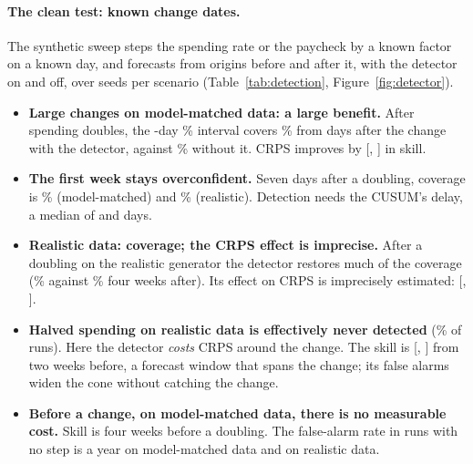 \paragraph{The clean test: known change dates.} The synthetic sweep steps
the spending rate or the paycheck by a known factor on a known day, and
forecasts from origins before and after it, with the detector on and off,
over  seeds per scenario (Table~\ref{tab:detection},
Figure~\ref{fig:detector}).
\begin{itemize}
\item \textbf{Large changes on model-matched data: a large benefit.} After
  spending doubles, the \hB-day \lC\% interval covers
  \% from
   days after the change with the detector, against
  \% without it. CRPS
  improves by 
  [,
  ] in skill.
\item \textbf{The first week stays overconfident.} Seven days after a
  doubling, coverage is \%
  (model-matched) and \%
  (realistic). Detection needs the CUSUM's delay, a median of
   and
   days.
\item \textbf{Realistic data: coverage; the CRPS effect is imprecise.}
  After a doubling on the realistic generator the detector restores much
  of the coverage (\%
  against \% four
  weeks after). Its effect on CRPS is imprecisely estimated:
  [,
  ].
\item \textbf{Halved spending on realistic data is effectively never
  detected} (\% of
  runs). Here the detector \emph{costs} CRPS around the change. The
  skill is 
  [,
  ] from two weeks
  before, a forecast window that spans the change; its false alarms widen
  the cone without catching the change.
\item \textbf{Before a change, on model-matched data, there is no
  measurable cost.} Skill is 
  four weeks before a doubling. The false-alarm rate in runs with no step
  is  a year on model-matched data and 
  on realistic data.
\end{itemize}
